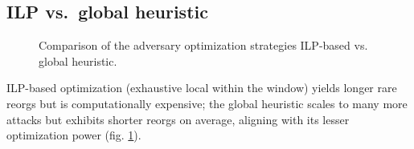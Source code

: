 \subsection{ILP vs.\ global heuristic}
\begin{figure}
\caption{Comparison of the adversary optimization strategies ILP-based vs. global heuristic.}
\label{fig:optimization}
\end{figure}
ILP-based optimization (exhaustive local within the window) yields longer rare reorgs but is computationally expensive; the global heuristic scales to many more attacks but exhibits shorter reorgs on average, aligning with its lesser optimization power (fig. \ref{fig:optimization}).

